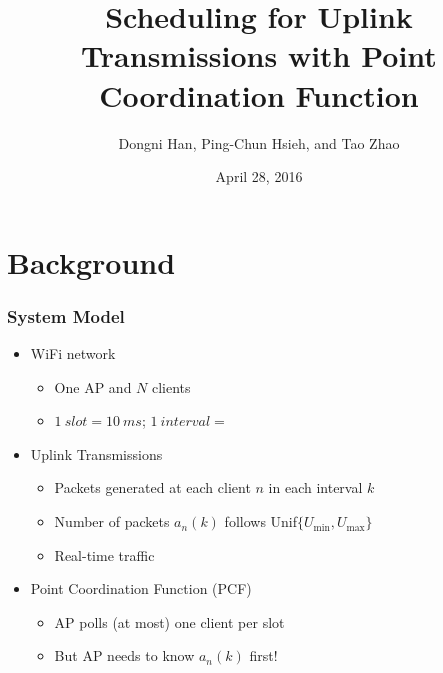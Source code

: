 \documentclass{beamer}
\begin{document}
\title{Scheduling for Uplink Transmissions with Point Coordination Function}
\author{Dongni Han, Ping-Chun Hsieh, and Tao Zhao}
\date{April 28, 2016}
\newtheorem{thm}{Theorem}
\begin{frame}
\titlepage
\end{frame}





\section{Background}

\begin{frame}
\frametitle{System Model}
\begin{itemize}
  \item WiFi network
    \begin{itemize}
      \item One AP and $N$ clients
      \item $\SI{1}{slot} = \SI{10}{ms}$; $\SI{1}{interval} =$ 
    \end{itemize}
  \item Uplink Transmissions
    \begin{itemize}
      \item Packets generated at each client $n$ in each interval $k$
      \item Number of packets $a_n(k)$ follows Unif$\{U_\text{min}, U_\text{max}\}$
      \item Real-time traffic
    \end{itemize}
  \item Point Coordination Function (PCF)
    \begin{itemize}
      \item AP polls (at most) one client per slot
      \item But AP needs to know $a_n(k)$ first!
    \end{itemize}
\end{itemize}
\end{frame}
\end{document}
